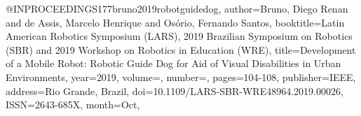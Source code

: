 @INPROCEEDINGS{177bruno2019robotguidedog,
author={Bruno, Diego Renan and de Assis, Marcelo Henrique and Osório, Fernando Santos},
booktitle={Latin American Robotics Symposium (LARS), 2019 Brazilian Symposium on Robotics (SBR) and 2019 Workshop on Robotics in Education (WRE)}, 
title={Development of a Mobile Robot: Robotic Guide Dog for Aid of Visual Disabilities in Urban Environments}, 
year={2019},
volume={},
number={},
pages={104-108},
publisher={IEEE},
address={Rio Grande, Brazil},
doi={10.1109/LARS-SBR-WRE48964.2019.00026},
ISSN={2643-685X},
month={Oct},}